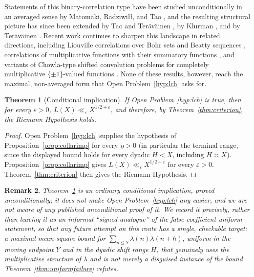 \documentclass[11pt]{article}
\newtheorem{theorem}{Theorem}[section]
\newtheorem{remark}[theorem]{Remark}
\begin{document}
Statements of this binary-correlation type have been studied unconditionally in an averaged sense by
Matom\"aki, Radziwi\l\l, and Tao \cite{matomaki-radziwill,matomaki-radziwill-tao,
matomaki-radziwill-tao-signs}, and the resulting structural picture has since been extended by Tao and
Ter\"av\"ainen \cite{tao-logchowla,tao-teravainen}, by Klurman \cite{klurman}, and by Ter\"av\"ainen
\cite{teravainen-binary}. Recent work continues to sharpen this landscape in related directions, including
Liouville correlations over Bohr sets and Beatty sequences \cite{teravainen-walker}, correlations of
multiplicative functions with their summatory functions \cite{chavez}, and variants of Chowla-type shifted
convolution problems for completely multiplicative $\{\pm1\}$-valued functions \cite{krishnamoorthy-chowla}.
None of these results, however, reach the maximal, non-averaged form that Open Problem~\ref{hyp:lch} asks
for.

\begin{theorem}[Conditional implication]
\label{thm:conditional}
If Open Problem~\ref{hyp:lch} is true, then for every $\varepsilon>0$, $L(X)\ll_\varepsilon
X^{1/2+\varepsilon}$, and therefore, by Theorem~\ref{thm:criterion}, the Riemann Hypothesis holds.
\end{theorem}

\begin{proof}
Open Problem~\ref{hyp:lch} supplies the hypothesis of Proposition~\ref{prop:collarimp} for every $\eta>0$
(in particular the terminal range, since the displayed bound holds for every dyadic $H<X$, including
$H\asymp X$). Proposition~\ref{prop:collarimp} gives $L(X)\ll_\varepsilon X^{1/2+\varepsilon}$ for every
$\varepsilon>0$. Theorem~\ref{thm:criterion} then gives the Riemann Hypothesis.
\end{proof}

\begin{remark}
Theorem~\ref{thm:conditional} is an ordinary conditional implication, proved unconditionally; it does not
make Open Problem~\ref{hyp:lch} any easier, and we are not aware of any published unconditional proof of
it. We record it precisely, rather than leaving it as an informal ``signed analogue'' of the false
coefficient-uniform statement, so that any future attempt on this route has a single, checkable target:
a maximal mean-square bound for $\sum_{n\le Y}\lambda(n)\lambda(n+h)$, uniform in the moving endpoint $Y$
and in the dyadic shift range $H$, that genuinely uses the multiplicative structure of $\lambda$ and is not
merely a disguised instance of the bound Theorem~\ref{thm:uniformfailure} refutes.
\end{remark}
\end{document}

